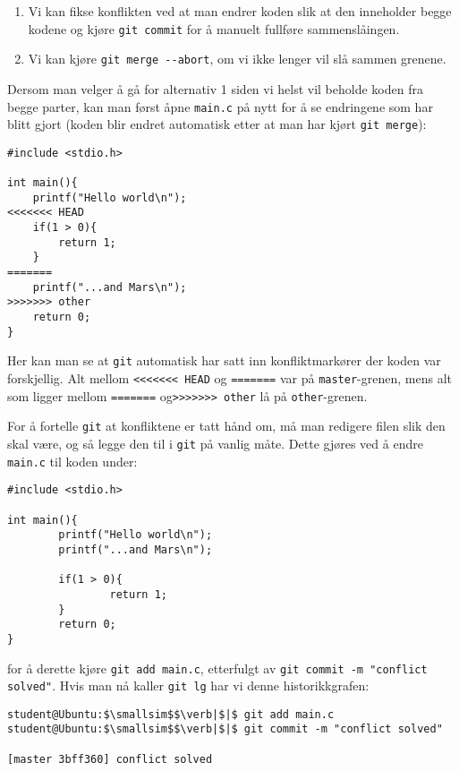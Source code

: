 \begin{alphasection}
\begin{enumerate}
    \item Vi kan fikse konflikten ved at man endrer koden slik at den inneholder begge kodene og kjøre \verb|git commit| for å manuelt fullføre sammenslåingen.
    \item Vi kan kjøre \verb|git merge --abort|, om vi ikke lenger vil slå sammen grenene. 
\end{enumerate}


Dersom man velger å gå for alternativ 1 siden vi helst vil beholde koden fra begge parter, kan man først åpne \verb|main.c| på nytt for å se endringene som har blitt gjort (koden blir endret automatisk etter at man har kjørt \verb|git merge|):

\begin{lstlisting}
#include <stdio.h>

int main(){
	printf("Hello world\n");
<<<<<<< HEAD
	if(1 > 0){
		return 1;
	}
=======
	printf("...and Mars\n");
>>>>>>> other
	return 0;
}
\end{lstlisting}

Her kan man se at \verb|git| automatisk har satt inn konfliktmarkører der koden var forskjellig. Alt mellom \verb|<<<<<<< HEAD| og \verb|=======| var på \verb|master|-grenen, mens alt som ligger mellom \verb|=======| og\verb|>>>>>>> other| lå på \verb|other|-grenen.

For å fortelle \verb|git| at konfliktene er tatt hånd om, må man redigere filen slik den skal være, og så legge den til i \verb|git| på vanlig måte. Dette gjøres ved å endre \verb|main.c| til koden under:

\begin{lstlisting}
#include <stdio.h>

int main(){
        printf("Hello world\n");
        printf("...and Mars\n");
        
        if(1 > 0){
                return 1;
        }
        return 0;
}
\end{lstlisting}

for å derette kjøre \verb|git add main.c|, etterfulgt av \verb|git commit -m "conflict solved"|. Hvis man nå kaller \verb|git lg| har vi denne historikkgrafen:

\begin{lstlisting}[mathescape=true]
student@Ubuntu:$\smallsim$$\verb|$|$ git add main.c
student@Ubuntu:$\smallsim$$\verb|$|$ git commit -m "conflict solved"

[master 3bff360] conflict solved


\end{lstlisting}
\end{alphasection}
